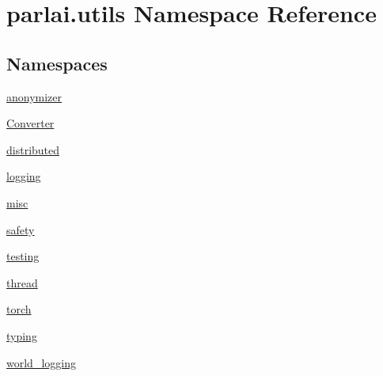 \hypertarget{namespaceparlai_1_1utils}{}\section{parlai.\+utils Namespace Reference}
\label{namespaceparlai_1_1utils}
\subsection*{Namespaces}
\begin{DoxyCompactItemize}
\item 
 \hyperlink{namespaceparlai_1_1utils_1_1anonymizer}{anonymizer}
\item 
 \hyperlink{namespaceparlai_1_1utils_1_1Converter}{Converter}
\item 
 \hyperlink{namespaceparlai_1_1utils_1_1distributed}{distributed}
\item 
 \hyperlink{namespaceparlai_1_1utils_1_1logging}{logging}
\item 
 \hyperlink{namespaceparlai_1_1utils_1_1misc}{misc}
\item 
 \hyperlink{namespaceparlai_1_1utils_1_1safety}{safety}
\item 
 \hyperlink{namespaceparlai_1_1utils_1_1testing}{testing}
\item 
 \hyperlink{namespaceparlai_1_1utils_1_1thread}{thread}
\item 
 \hyperlink{namespaceparlai_1_1utils_1_1torch}{torch}
\item 
 \hyperlink{namespaceparlai_1_1utils_1_1typing}{typing}
\item 
 \hyperlink{namespaceparlai_1_1utils_1_1world__logging}{world\+\_\+logging}
\end{DoxyCompactItemize}
